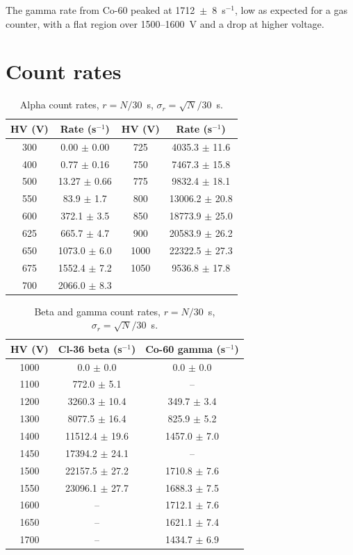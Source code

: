 \documentclass[12pt]{article}
\begin{document}
The gamma rate from Co-60 peaked at 1712~$\pm$~8~s$^{-1}$, low as expected for a gas counter, with a flat region over 1500--1600~V and a drop at higher voltage.



\appendix
\section{Count rates}
\label{app:rates}

\begin{table}[!htbp]
\centering\small\setlength{\tabcolsep}{4pt}
\begin{tabular}{cc|cc}
\toprule
\textbf{HV (V)} & \textbf{Rate (s$^{-1}$)} & \textbf{HV (V)} & \textbf{Rate (s$^{-1}$)} \\
\midrule
300 & 0.00 $\pm$ 0.00 & 725 & 4035.3 $\pm$ 11.6 \\
400 & 0.77 $\pm$ 0.16 & 750 & 7467.3 $\pm$ 15.8 \\
500 & 13.27 $\pm$ 0.66 & 775 & 9832.4 $\pm$ 18.1 \\
550 & 83.9 $\pm$ 1.7 & 800 & 13006.2 $\pm$ 20.8 \\
600 & 372.1 $\pm$ 3.5 & 850 & 18773.9 $\pm$ 25.0 \\
625 & 665.7 $\pm$ 4.7 & 900 & 20583.9 $\pm$ 26.2 \\
650 & 1073.0 $\pm$ 6.0 & 1000 & 22322.5 $\pm$ 27.3 \\
675 & 1552.4 $\pm$ 7.2 & 1050 & 9536.8 $\pm$ 17.8 \\
700 & 2066.0 $\pm$ 8.3 & & \\
\bottomrule
\end{tabular}
\caption{Alpha count rates, $r = N/30$~s, $\sigma_r = \sqrt{N}/30$~s.}
\label{tab:appalpha}
\end{table}

\begin{table}[!htbp]
\centering\small
\begin{tabular}{ccc}
\toprule
\textbf{HV (V)} & \textbf{Cl-36 beta (s$^{-1}$)} & \textbf{Co-60 gamma (s$^{-1}$)} \\
\midrule
1000 & 0.0 $\pm$ 0.0 & 0.0 $\pm$ 0.0 \\
1100 & 772.0 $\pm$ 5.1 & -- \\
1200 & 3260.3 $\pm$ 10.4 & 349.7 $\pm$ 3.4 \\
1300 & 8077.5 $\pm$ 16.4 & 825.9 $\pm$ 5.2 \\
1400 & 11512.4 $\pm$ 19.6 & 1457.0 $\pm$ 7.0 \\
1450 & 17394.2 $\pm$ 24.1 & -- \\
1500 & 22157.5 $\pm$ 27.2 & 1710.8 $\pm$ 7.6 \\
1550 & 23096.1 $\pm$ 27.7 & 1688.3 $\pm$ 7.5 \\
1600 & -- & 1712.1 $\pm$ 7.6 \\
1650 & -- & 1621.1 $\pm$ 7.4 \\
1700 & -- & 1434.7 $\pm$ 6.9 \\
\bottomrule
\end{tabular}
\caption{Beta and gamma count rates, $r = N/30$~s, $\sigma_r = \sqrt{N}/30$~s.}
\label{tab:appbg}
\end{table}
\end{document}
